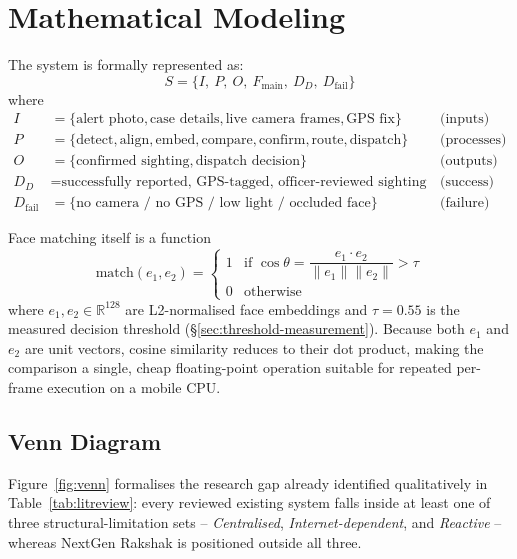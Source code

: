 \documentclass[12pt,a4paper,oneside]{report}
\begin{document}
\section{Mathematical Modeling}

The system is formally represented as:
\[
S = \{ I,\ P,\ O,\ F_{\text{main}},\ D_D,\ D_{\text{fail}} \}
\]
where
\begin{align*}
I &= \{\text{alert photo}, \text{case details}, \text{live camera frames}, \text{GPS fix}\} && \text{(inputs)}\\
P &= \{\text{detect}, \text{align}, \text{embed}, \text{compare}, \text{confirm}, \text{route}, \text{dispatch}\} && \text{(processes)}\\
O &= \{\text{confirmed sighting}, \text{dispatch decision}\} && \text{(outputs)}\\
D_D &= \text{successfully reported, GPS-tagged, officer-reviewed sighting} && \text{(success)}\\
D_{\text{fail}} &= \{\text{no camera / no GPS / low light / occluded face}\} && \text{(failure)}
\end{align*}

Face matching itself is a function
\[
\mathrm{match}(e_1, e_2) =
\begin{cases}
1 & \text{if } \cos\theta = \dfrac{e_1 \cdot e_2}{\lVert e_1\rVert \lVert e_2\rVert} > \tau \\[4pt]
0 & \text{otherwise}
\end{cases}
\]
where $e_1, e_2 \in \mathbb{R}^{128}$ are L2-normalised face embeddings and
$\tau = 0.55$ is the measured decision threshold (\S\ref{sec:threshold-measurement}). Because both
$e_1$ and $e_2$ are unit vectors, cosine similarity reduces to their dot
product, making the comparison a single, cheap floating-point operation
suitable for repeated per-frame execution on a mobile CPU.

\subsection{Venn Diagram}

Figure~\ref{fig:venn} formalises the research gap already identified
qualitatively in Table~\ref{tab:litreview}: every reviewed existing system
falls inside at least one of three structural-limitation sets --
\emph{Centralised}, \emph{Internet-dependent}, and \emph{Reactive} --
whereas NextGen Rakshak is positioned outside all three.
\end{document}
